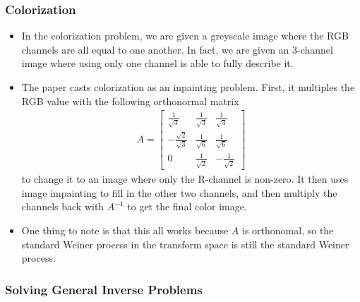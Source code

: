 \documentclass[10pt]{article}
\begin{document}
\subsubsection{Colorization}

\begin{itemize}
  \item In the colorization problem, we are given a greyscale image where the RGB channels are all equal to one another. In fact, we are given an 3-channel image where using only one channel is able to fully describe it.
  
  \item The paper casts colorization as an inpainting problem. First, it multiples the RGB value with the following orthonormal matrix
  \begin{align*}
    A = \begin{bmatrix}
      \frac{1}{\sqrt{3}} & \frac{1}{\sqrt{3}} & \frac{1}{\sqrt{3}} \\
      -\frac{\sqrt{2}}{\sqrt{3}} & \frac{1}{\sqrt{6}} & \frac{1}{\sqrt{6}} \\
      0 & \frac{1}{\sqrt{2}} & -\frac{1}{\sqrt{2}}
    \end{bmatrix}
  \end{align*}
  to change it to an image where only the R-channel is non-zero. It then uses image impainting to fill in the other two channels, and then multiply the channels back with $A^{-1}$ to get the final color image.

  \item One thing to note is that this all works because $A$ is orthonomal, so the standard Weiner process in the transform space is still the standard Weiner process.
\end{itemize}

\subsubsection{Solving General Inverse Problems}
\end{document}
